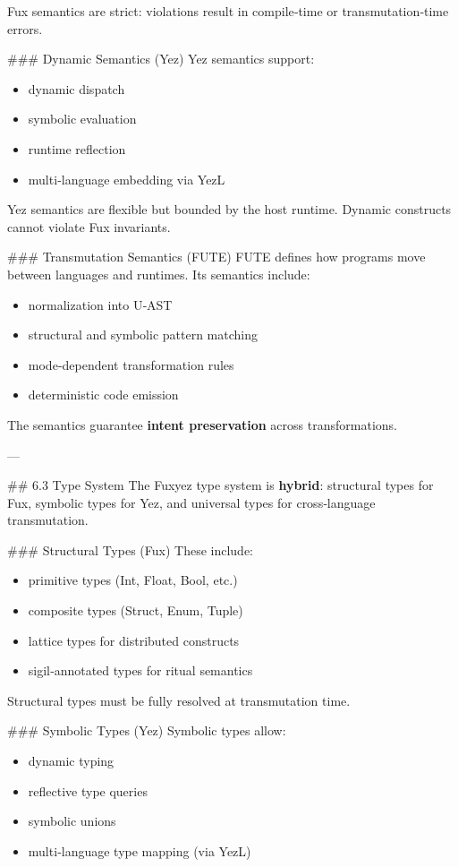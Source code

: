 \documentclass[12pt, a4paper]{book}
\begin{document}
Fux semantics are strict: violations result in compile‑time or transmutation‑time errors.

\#\#\# Dynamic Semantics (Yez)  
Yez semantics support:  
\begin{itemize}
  \item dynamic dispatch  
  \item symbolic evaluation  
  \item runtime reflection  
  \item multi‑language embedding via YezL
\end{itemize}

Yez semantics are flexible but bounded by the host runtime. Dynamic constructs cannot violate Fux invariants.

\#\#\# Transmutation Semantics (FUTE)  
FUTE defines how programs move between languages and runtimes. Its semantics include:  
\begin{itemize}
  \item normalization into U‑AST  
  \item structural and symbolic pattern matching  
  \item mode‑dependent transformation rules  
  \item deterministic code emission
\end{itemize}

The semantics guarantee \textbf{intent preservation} across transformations.

---

\#\# 6.3 Type System  
The Fuxyez type system is \textbf{hybrid}: structural types for Fux, symbolic types for Yez, and universal types for cross‑language transmutation.

\#\#\# Structural Types (Fux)  
These include:  
\begin{itemize}
  \item primitive types (Int, Float, Bool, etc.)  
  \item composite types (Struct, Enum, Tuple)  
  \item lattice types for distributed constructs  
  \item sigil‑annotated types for ritual semantics
\end{itemize}

Structural types must be fully resolved at transmutation time.

\#\#\# Symbolic Types (Yez)  
Symbolic types allow:  
\begin{itemize}
  \item dynamic typing  
  \item reflective type queries  
  \item symbolic unions  
  \item multi‑language type mapping (via YezL)
\end{itemize}
\end{document}
